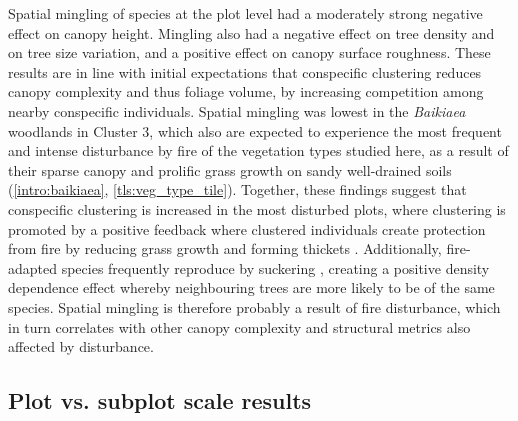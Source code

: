 \begin{refsection}
Spatial mingling of species at the plot level had a moderately strong negative effect on canopy height. Mingling also had a negative effect on tree density and on tree size variation, and a positive effect on canopy surface roughness. These results are in line with initial expectations that conspecific clustering reduces canopy complexity and thus foliage volume, by increasing competition among nearby conspecific individuals. Spatial mingling was lowest in the \textit{Baikiaea} woodlands in Cluster 3, which also are expected to experience the most frequent and intense disturbance by fire of the vegetation types studied here, as a result of their sparse canopy and prolific grass growth on sandy well-drained soils (\autoref{intro:baikiaea}, \autoref{tls:veg_type_tile}). Together, these findings suggest that conspecific clustering is increased in the most disturbed plots, where clustering is promoted by a positive feedback where clustered individuals create protection from fire by reducing grass growth and forming thickets \citep{CharlesDominique2018}. Additionally, fire-adapted species frequently reproduce by suckering \citep{Hoffmann1998}, creating a positive density dependence effect whereby neighbouring trees are more likely to be of the same species. Spatial mingling is therefore probably a result of fire disturbance, which in turn correlates with other canopy complexity and structural metrics also affected by disturbance.

\subsection{Plot vs. subplot scale results}
\label{tls:ssec:plot_subplot}


\end{refsection}
